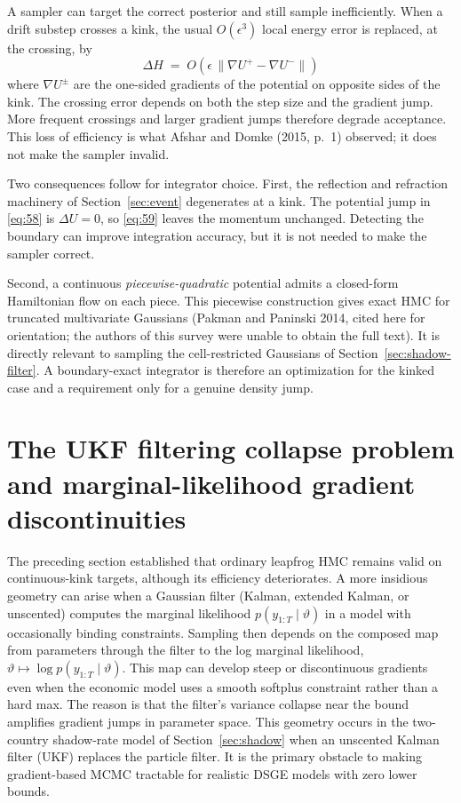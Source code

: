 \documentclass[11pt]{article}
\begin{document}
A sampler can target the correct posterior and still sample inefficiently. When a drift substep crosses a kink, the usual $O(\epsilon^3)$ local energy error is replaced, at the crossing, by
\begin{equation}\label{eq:56a}
 \Delta H \;=\; O\!\left(\epsilon\,
 \bigl\|\nabla U^{+}-\nabla U^{-}\bigr\|\right)
\end{equation}
where $\nabla U^{\pm}$ are the one-sided gradients of the potential on opposite sides of the kink. The crossing error depends on both the step size and the gradient jump. More frequent crossings and larger gradient jumps therefore degrade acceptance. This loss of efficiency is what Afshar and Domke (2015, p.~1) observed; it does not make the sampler invalid.

Two consequences follow for integrator choice. First, the reflection and refraction machinery of Section~\ref{sec:event} degenerates at a kink. The potential jump in \eqref{eq:58} is $\Delta U=0$, so \eqref{eq:59} leaves the momentum unchanged. Detecting the boundary can improve integration accuracy, but it is not needed to make the sampler correct.

Second, a continuous \emph{piecewise-quadratic} potential admits a closed-form Hamiltonian flow on each piece. This piecewise construction gives exact HMC for truncated multivariate Gaussians (Pakman and Paninski 2014, cited here for orientation; the authors of this survey were unable to obtain the full text). It is directly relevant to sampling the cell-restricted Gaussians of Section~\ref{sec:shadow-filter}. A boundary-exact integrator is therefore an optimization for the kinked case and a requirement only for a genuine density jump.

\section{The UKF filtering collapse problem and marginal-likelihood gradient discontinuities}\label{sec:ukf-gradient}

The preceding section established that ordinary leapfrog HMC remains valid on continuous-kink targets, although its efficiency deteriorates. A more insidious geometry can arise when a Gaussian filter (Kalman, extended Kalman, or unscented) computes the marginal likelihood $p(y_{1:T}\mid\vartheta)$ in a model with occasionally binding constraints. Sampling then depends on the composed map from parameters through the filter to the log marginal likelihood,
$\vartheta\mapsto\log p(y_{1:T}\mid\vartheta)$.
This map can develop steep or discontinuous gradients even when the economic model uses a smooth softplus constraint rather than a hard max. The reason is that the filter's variance collapse near the bound amplifies gradient jumps in parameter space. This geometry occurs in the two-country shadow-rate model of Section~\ref{sec:shadow} when an unscented Kalman filter (UKF) replaces the particle filter. It is the primary obstacle to making gradient-based MCMC tractable for realistic DSGE models with zero lower bounds.
\end{document}
